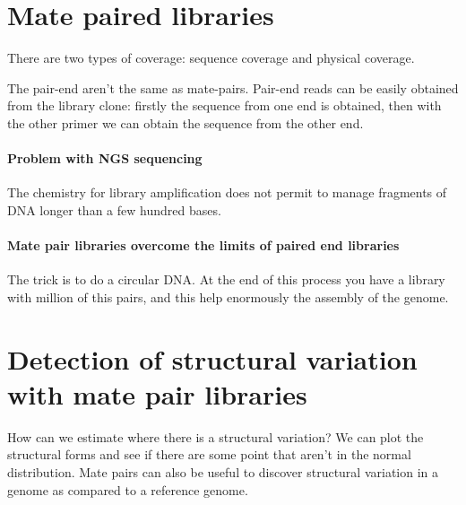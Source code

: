 \section{Mate paired libraries}

There are two types of coverage: sequence coverage and physical coverage.

The pair-end aren't the same as mate-pairs.
Pair-end reads can be easily obtained from the library clone: firstly the 
sequence from one end is obtained, then with the other primer we can obtain the 
sequence from the other end.

\paragraph*{Problem with NGS sequencing} The chemistry for library 
amplification does not permit to manage fragments of DNA longer than a few 
hundred bases.
\paragraph*{Mate pair libraries overcome the limits of paired end libraries}
The trick is to do a circular DNA. At the end of this process you have a
library with million of this pairs, and this help enormously the assembly of
the genome.

\section{Detection of structural variation with mate pair libraries}

How can we estimate where there is a structural variation? We can plot the 
structural forms and see if there are some point that aren't in the normal 
distribution. Mate pairs can also be useful to discover structural variation in 
a genome as compared to a reference genome.
